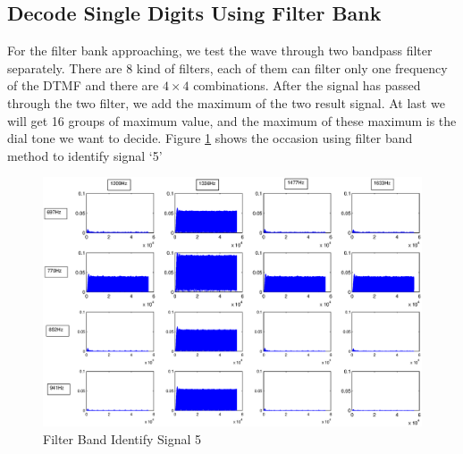 \documentclass[journal]{./sty/IEEEtran}
\let\MYoriglatexcaption\caption
\renewcommand{\caption}[2][\relax]{\MYoriglatexcaption[#2]{#2}}
\begin{document}
\subsection{Decode Single Digits Using Filter Bank}
For the filter bank approaching, we test the wave through two bandpass filter separately. There are 8 kind of filters, each of them can filter only one frequency of the DTMF and there are $4\times 4$ combinations. After the signal has passed through the two filter, we add the maximum of the two result signal. At last we will get 16 groups of maximum value, and the maximum of these maximum is the dial tone we want to decide. Figure \ref{fig:fb5} shows the occasion using filter band method to identify signal `5'
 \begin{figure}[!t]
\centering
\includegraphics[width=0.5 \textwidth]{./pic/filterband5.eps}
\caption{Filter Band Identify Signal 5}\label{fig:fb5}
\end{figure}
\*\\
\end{document}
